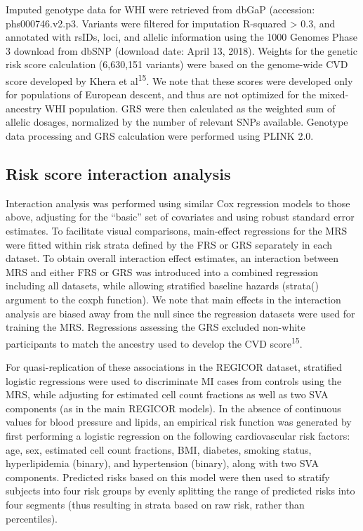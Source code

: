 \documentclass[]{article}
\begin{document}
Imputed genotype data for WHI were retrieved from dbGaP (accession:
phs000746.v2.p3. Variants were filtered for imputation R-squared
\textgreater{} 0.3, and annotated with rsIDs, loci, and allelic
information using the 1000 Genomes Phase 3 download from dbSNP (download
date: April 13, 2018). Weights for the genetic risk score calculation
(6,630,151 variants) were based on the genome-wide CVD score developed
by Khera et al\textsuperscript{15}. We note that these scores were
developed only for populations of European descent, and thus are not
optimized for the mixed-ancestry WHI population. GRS were then
calculated as the weighted sum of allelic dosages, normalized by the
number of relevant SNPs available. Genotype data processing and GRS
calculation were performed using PLINK 2.0.

\hypertarget{risk-score-interaction-analysis}{%
\subsection{Risk score interaction
analysis}\label{risk-score-interaction-analysis}}

Interaction analysis was performed using similar Cox regression models
to those above, adjusting for the ``basic'' set of covariates and using
robust standard error estimates. To facilitate visual comparisons,
main-effect regressions for the MRS were fitted within risk strata
defined by the FRS or GRS separately in each dataset. To obtain overall
interaction effect estimates, an interaction between MRS and either FRS
or GRS was introduced into a combined regression including all datasets,
while allowing stratified baseline hazards (strata() argument to the
coxph function). We note that main effects in the interaction analysis
are biased away from the null since the regression datasets were used
for training the MRS. Regressions assessing the GRS excluded non-white
participants to match the ancestry used to develop the CVD
score\textsuperscript{15}.

For quasi-replication of these associations in the REGICOR dataset,
stratified logistic regressions were used to discriminate MI cases from
controls using the MRS, while adjusting for estimated cell count
fractions as well as two SVA components (as in the main REGICOR models).
In the absence of continuous values for blood pressure and lipids, an
empirical risk function was generated by first performing a logistic
regression on the following cardiovascular risk factors: age, sex,
estimated cell count fractions, BMI, diabetes, smoking status,
hyperlipidemia (binary), and hypertension (binary), along with two SVA
components. Predicted risks based on this model were then used to
stratify subjects into four risk groups by evenly splitting the range of
predicted risks into four segments (thus resulting in strata based on
raw risk, rather than percentiles).
\end{document}
